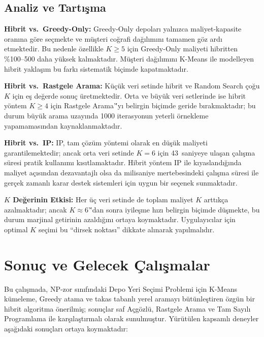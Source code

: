 \documentclass[conference]{IEEEtran}
\begin{document}
\subsection{Analiz ve Tart{\i}\c{s}ma}

\textbf{Hibrit vs.\ Greedy-Only:}
Greedy-Only depolar{\i} yaln{\i}zca maliyet-kapasite oran{\i}na
g\"{o}re se\c{c}mekte ve m\"{u}\c{s}teri co\u{g}rafi da\u{g}{\i}l{\i}m{\i}n{\i}
tamamen g\"{o}z ard{\i} etmektedir.
Bu nedenle \"{o}zellikle $K \geq 5$ i\c{c}in Greedy-Only maliyeti
hibritten \%100--500 daha y\"{u}ksek kalmaktad{\i}r.
M\"{u}\c{s}teri da\u{g}{\i}l{\i}m{\i}n{\i} K-Means ile modelleyen
hibrit yakla\c{s}{\i}m bu fark{\i} sistematik bi\c{c}imde kapatmaktad{\i}r.

\textbf{Hibrit vs.\ Rastgele Arama:}
K\"{u}\c{c}\"{u}k veri setinde hibrit ve Random Search \c{c}o\u{g}u $K$
i\c{c}in e\c{s} de\u{g}erde sonu\c{c} \"{u}retmektedir.
Orta ve b\"{u}y\"{u}k veri setlerinde ise hibrit y\"{o}ntem
$K \geq 4$ i\c{c}in Rastgele Arama'\''y{\i} belirgin bi\c{c}imde geride
b{\i}rakmaktad{\i}r; bu durum b\"{u}y\"{u}k arama uzay{\i}nda 1000
iterasyonun yeterli \"{o}rnekleme yapamamas{\i}ndan kaynaklanmaktad{\i}r.

\textbf{Hibrit vs.\ IP:}
IP, tam \c{c}\"{o}z\"{u}m y\"{o}ntemi olarak en d\"{u}\c{s}\"{u}k maliyeti
garantilemektedir; ancak orta veri setinde $K{=}6$ i\c{c}in 43~saniyeye
ula\c{s}an \c{c}al{\i}\c{s}ma s\"{u}resi pratik kullan{\i}m{\i} k{\i}s{\i}tlamaktad{\i}r.
Hibrit y\"{o}ntem IP ile k{\i}yasland{\i}\u{g}{\i}nda maliyet a\c{c}{\i}s{\i}ndan
dezavantajl{\i} olsa da milisaniye mertebesindeki \c{c}al{\i}\c{s}ma s\"{u}resi
ile ger\c{c}ek zamanl{\i} karar destek sistemleri i\c{c}in uygun bir
se\c{c}enek sunmaktad{\i}r.

\textbf{$K$ De\u{g}erinin Etkisi:}
Her \"{u}\c{c} veri setinde de toplam maliyet $K$ artt{\i}k\c{c}a
azalmaktad{\i}r; ancak $K \approx 6$'\''dan sonra iyile\c{s}me h{\i}z{\i}
belirgin bi\c{c}imde d\"{u}\c{s}mekte, bu durum marjinal getirinin
azald{\i}\u{g}{\i}n{\i} ortaya koymaktad{\i}r.
Uygulay{\i}c{\i}lar i\c{c}in optimal $K$ se\c{c}imi bu ``dirsek noktas{\i}''
dikkate al{\i}narak yap{\i}lmal{\i}d{\i}r.

\section{Sonu\c{c} ve Gelecek \c{C}al{\i}\c{s}malar}
\label{sec:conc}

Bu \c{c}al{\i}\c{s}mada, NP-zor s{\i}n{\i}f{\i}ndaki Depo Yeri Se\c{c}imi
Problemi i\c{c}in K-Means k\"{u}meleme, Greedy atama ve takas tabanl{\i}
yerel aramay{\i} b\"{u}t\"{u}nle\c{s}tiren \"{o}zg\"{u}n bir hibrit
algoritma \"{o}nerilmi\c{s}; sonu\c{c}lar saf A\c{c}g\"{o}zl\"{u},
Rastgele Arama ve Tam Say{\i}l{\i} Programlama ile kar\c{s}{\i}la\c{s}t{\i}rmal{\i}
olarak sunulmu\c{s}tur.
Y\"{u}r\"{u}t\"{u}len kapsaml{\i} deneyler a\c{s}a\u{g}{\i}daki
sonu\c{c}lar{\i} ortaya koymaktad{\i}r:
\end{document}
